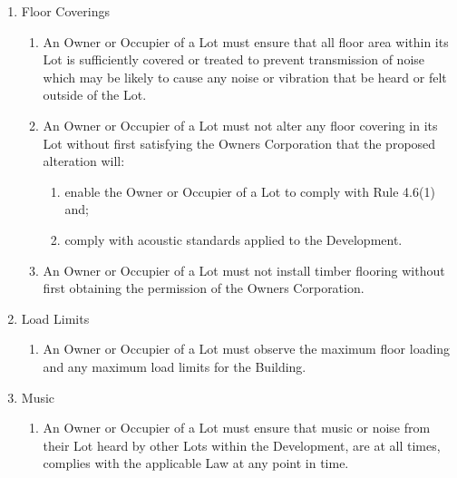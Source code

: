 \documentclass{article}
\begin{document}
\begin{enumerate}[label=\arabic*.]
\begin{enumerate}[label=\arabic{enumi}.\arabic*.]
\begin{enumerate}[label=(\arabic*)]
\begin{enumerate}[label=(\alph*)]
\end{enumerate}

\end{enumerate}

\item  Floor Coverings

\begin{enumerate}[label=(\arabic*)]

\item  An Owner or Occupier of a Lot must ensure that all floor area within its Lot is sufficiently covered or treated to prevent transmission of noise which may be likely to cause any noise or vibration that be heard or felt outside of the Lot.

\item  An Owner or Occupier of a Lot must not alter any floor covering in its Lot without first satisfying the Owners Corporation that the proposed alteration will:

\begin{enumerate}[label=(\alph*)]

\item  enable the Owner or Occupier of a Lot to comply with Rule 4.6(1) and;

\item  comply with acoustic standards applied to the Development.

\end{enumerate}

\item  An Owner or Occupier of a Lot must not install timber flooring without first obtaining the permission of the Owners Corporation.

\end{enumerate}

\item  Load Limits

\begin{enumerate}[label=(\arabic*)]

\item  An Owner or Occupier of a Lot must observe the maximum floor loading and any maximum load limits for the Building.

\end{enumerate}

\item  Music

\begin{enumerate}[label=(\arabic*)]

\item  An Owner or Occupier of a Lot must ensure that music or noise from their Lot heard by other Lots within the Development, are at all times, complies with the applicable Law at any point in time.
\newpage




\end{enumerate}
\end{enumerate}
\end{enumerate}
\end{document}
